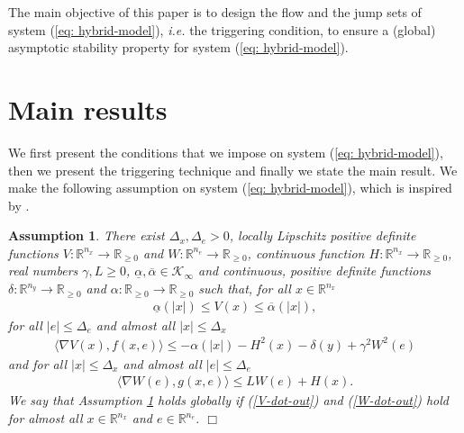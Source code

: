 \documentclass[a4paper, 9pt, twocolumn]{IEEEtran}
\theoremstyle{plain}
\newtheorem{ass}{Assumption}
\theoremstyle{definition}
\newcommand{\R}[2]{\ensuremath{\mathbb{R}^{#1}_{#2}}}
\newcommand{\Kinf}{\ensuremath{\mathcal{K}_{\infty}}}
\begin{document}
The main objective of this paper is to design the flow and the jump sets of system (\ref{eq: hybrid-model}), \textit{i.e.} the triggering condition, to ensure a (global) asymptotic stability property for system (\ref{eq: hybrid-model}).


\section{Main results}\label{sec: main-results}
We first present the conditions that we impose on system (\ref{eq: hybrid-model}), then we present the triggering technique and finally we state the main result. We make the following assumption on system (\ref{eq: hybrid-model}), which is inspired by \cite{Nesic2009explicit}.

\begin{ass} \label{ass-clock-out}
There exist $\Delta_{x}, \Delta_{e}>0$, locally Lipschitz positive definite functions $V: \R{n_{x}}{}\rightarrow\R{}{\geq 0}$ and $W: \R{n_{e}}{}\rightarrow\R{}{\geq 0}$, continuous function $H: \R{n_{x}}{}\rightarrow\R{}{\geq 0}$, real numbers $\gamma, L\geq 0$, $\underline{\alpha}, \overline{\alpha} \in \Kinf$ and continuous, positive definite functions $\delta: \R{n_{y}}{}\rightarrow\R{}{\geq 0}$ and $\alpha: \R{}{\geq 0}\rightarrow\R{}{\geq 0}$ such that, for all $x\in\R{n_{x}}{}$
\begin{align} \label{Vx-bounds-out}
  \underline{\alpha}(|x|) \leq V(x) \leq \overline{\alpha}(|x|),
\end{align}
for all $|e| \leq \Delta_{e}$ and almost all $|x| \leq \Delta_{x}$
\begin{align} \label{V-dot-out}
  \langle\nabla V(x), f(x,e)\rangle \leq -\alpha(|x|) - H^{2}(x) - \delta(y) + \gamma^{2} W^{2}(e)
\end{align}
and for all $|x| \leq \Delta_{x}$ and almost all $|e| \leq \Delta_{e}$
\begin{align}\label{W-dot-out}
  \langle\nabla W(e), g(x,e)\rangle \leq LW(e) + H(x).
\end{align}
We say that Assumption \ref{ass-clock-out} holds globally if (\ref{V-dot-out}) and (\ref{W-dot-out}) hold for almost all $x\in\R{n_{x}}{}$ and $e\in\R{n_{e}}{}$.
\hspace*{\fill} $\Box$
\end{ass}
\end{document}
